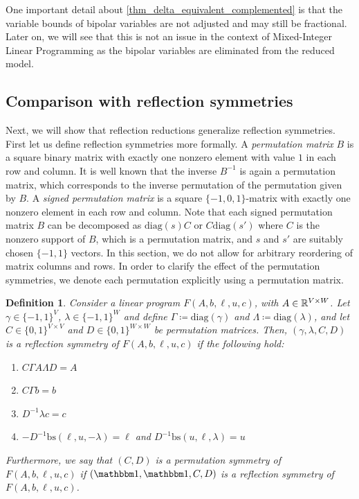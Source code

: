 \documentclass[pdflatex,sn-mathphys-num]{sn-jnl}%
\theoremstyle{thmstyleone}%
\newtheorem{definition}{Definition}
\theoremstyle{thmstylethree}%
\theoremstyle{thmstyletwo}%
\newcommand{\diag}{\mathrm{diag}}
\begin{document}
One important detail about \cref{thm_delta_equivalent_complemented} is that the variable bounds of bipolar variables are not adjusted and may still be fractional. Later on, we will see that this is not an issue in the context of Mixed-Integer Linear Programming as the bipolar variables are eliminated from the reduced model.

\subsection{Comparison with reflection symmetries}
Next, we will show that reflection reductions generalize reflection symmetries. First let us define reflection symmetries more formally. A \emph{permutation matrix} $B$ is a square binary matrix with exactly one nonzero element with value $1$ in each row and column. It is well known that the inverse $B^{-1}$ is again a permutation matrix, which corresponds to the inverse permutation of the permutation given by $B$. A \emph{signed permutation matrix} is a square $\{-1,0,1\}$-matrix with exactly one nonzero element in each row and column. Note that each signed permutation matrix $B$ can be decomposed as $\diag(s) C$ or $C \diag(s')$ where $C$ is the nonzero support of $B$, which is a permutation matrix, and $s$ and $s'$ are suitably chosen $\{-1,1\}$ vectors.
In this section, we do not allow for arbitrary reordering of matrix columns and rows. In order to clarify the effect of the permutation symmetries, we denote each permutation explicitly using a permutation matrix.

\begin{definition}
Consider a linear program $F(A,b,\ell,u,c)$, with $A\in \mathbb{R}^{V\times W}$. Let $\gamma \in \{-1,1\}^V$, $\lambda \in \{-1,1\}^W$ and define $\Gamma \coloneqq\diag(\gamma)$ and $\Lambda \coloneqq \diag(\lambda)$, and let $C\in \{0,1\}^{V\times V}$ and $D\in \{0,1\}^{W\times W}$ be permutation matrices. Then, $(\gamma,\lambda,C,D)$ is a \emph{reflection symmetry of $F(A,b,\ell,u,c)$} if the following hold:
\begin{enumerate}[label=(\roman*)]
    \item $C\Gamma A \Lambda D = A$
    \item $C \Gamma b = b$
    \item $D^{-1} \lambda c = c$
    \item $-D^{-1}\mathrm{bs}(\ell,u,-\lambda)  = \ell$ and $D^{-1}\mathrm{bs}(u,\ell,\lambda)= u$
\end{enumerate}
Furthermore, we say that $(C,D)$ is a \emph{permutation symmetry} of $F(A,b,\ell,u,c)$ if $(\onevec,\onevec,C,D)$ is a reflection symmetry of $F(A,b,\ell,u,c)$.
\end{definition}
\end{document}
